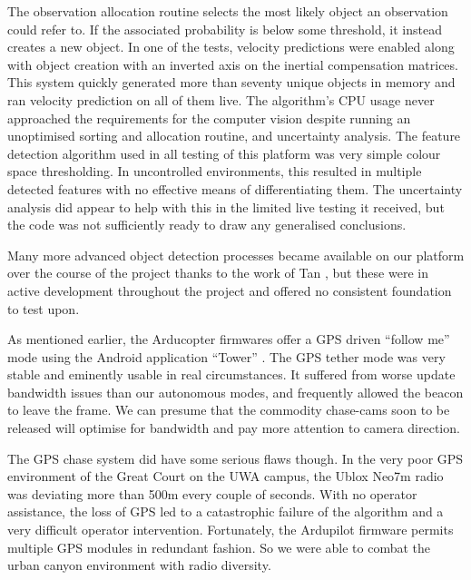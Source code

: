 \documentclass{article}
\newcounter{subsubsubsection}[subsubsection]
\begin{document}
        The observation allocation routine selects the most likely object an observation could refer to. If the associated probability is below some threshold, it instead creates a new object.
        In one of the tests, velocity predictions were enabled along with object creation with an inverted axis on the inertial compensation matrices. This system quickly generated more than seventy unique objects in memory and ran velocity prediction on all of them live. The algorithm's CPU usage never approached the requirements for the computer vision despite running an unoptimised sorting and allocation routine, and uncertainty analysis.
        The feature detection algorithm used in all testing of this platform was very simple colour space thresholding.  In uncontrolled environments, this resulted in multiple detected features with no effective means of differentiating them.  The uncertainty analysis did appear to help with this in the limited live testing it received, but the code was not sufficiently ready to draw any generalised conclusions.

        Many more advanced object detection processes became available on our platform over the course of the project thanks to the work of Tan \cite{Tan}, but these were in active development throughout the project and offered no consistent foundation to test upon.

        As mentioned earlier, the Arducopter firmwares offer a GPS driven ``follow me'' mode using the Android application ``Tower'' \cite{3dr-tower}.
        The GPS tether mode was very stable and eminently usable in real circumstances.  It suffered from worse update bandwidth issues than our autonomous modes, and frequently allowed the beacon to leave the frame.  We can presume that the commodity chase-cams soon to be released will optimise for bandwidth and pay more attention to camera direction.

        The GPS chase system did have some serious flaws though.  In the very poor GPS environment of the Great Court on the UWA campus, the Ublox Neo7m radio was deviating more than 500m every couple of seconds.  With no operator assistance, the loss of GPS led to a catastrophic failure of the algorithm and a very difficult operator intervention.  Fortunately, the Ardupilot firmware permits multiple GPS modules in redundant fashion.  So we were able to combat the urban canyon environment with radio diversity.
\end{document}
